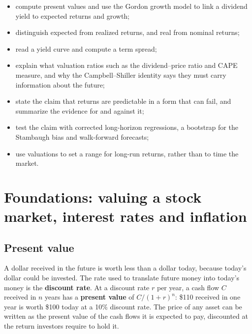 \begin{itemize}
  \item compute present values and use the Gordon growth model to link a dividend yield to expected returns and growth;
  \item distinguish expected from realized returns, and real from nominal returns;
  \item read a yield curve and compute a term spread;
  \item explain what valuation ratios such as the dividend--price ratio and CAPE measure, and why the Campbell--Shiller identity says they must carry information about the future;
  \item state the claim that returns are predictable in a form that can fail, and summarize the evidence for and against it;
  \item test the claim with corrected long-horizon regressions, a bootstrap for the Stambaugh bias and walk-forward forecasts;
  \item use valuations to set a range for long-run returns, rather than to time the market.
\end{itemize}

\section{Foundations: valuing a stock market, interest rates and inflation}
\label{sec:07-foundations}

\subsection{Present value}

A dollar received in the future is worth less than a dollar today, because today's dollar could be invested. The rate used to translate future money into today's money is the \textbf{discount rate}. At a discount rate $r$ per year, a cash flow $C$ received in $n$ years has a \textbf{present value} of $C/(1 + r)^n$: \$110 received in one year is worth \$100 today at a 10\% discount rate. The price of any asset can be written as the present value of the cash flows it is expected to pay, discounted at the return investors require to hold it.

